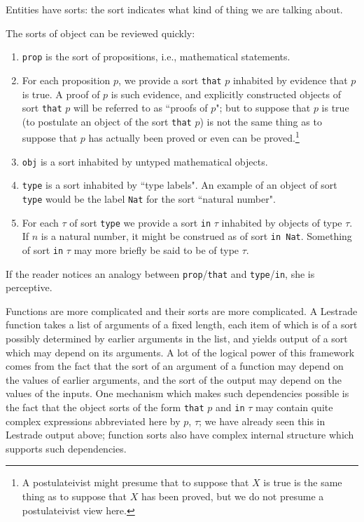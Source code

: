 \documentclass[12pt]{article}
\begin{document}
Entities have sorts:  the sort indicates what kind of thing we are talking about.  

The sorts of object can be reviewed quickly:

\begin{enumerate}

\item {\tt prop} is the sort of propositions, i.e., mathematical statements.

\item For each proposition $p$, we provide a sort {\tt that} $p$ inhabited by evidence that $p$ is true.  A proof of $p$ is such evidence, and explicitly constructed objects of sort {\tt that} $p$ will be referred to as ``proofs of $p$";  but to suppose that $p$ is true (to postulate an object of the sort {\tt that} $p$) is not the same thing as to suppose that $p$ has actually been proved or even can be proved.\footnote{A postulateivist might presume that to suppose that $X$ is true is the same thing as to suppose that $X$ has been proved, but we do not presume a postulateivist view here.}

\item {\tt obj} is a sort inhabited by untyped mathematical objects.

\item {\tt type} is a sort inhabited by ``type labels".  An example of an object of sort {\tt type} would be the label {\tt Nat} for the sort ``natural number".

\item For each $\tau$ of sort {\tt type} we provide a sort {\tt in} $\tau$ inhabited by objects of type $\tau$.  If $n$ is a natural number, it might be construed as of sort {\tt in Nat}.  Something of sort {\tt in} $\tau$ may more briefly be said to be of type $\tau$.

\end{enumerate}

If the reader notices an analogy between {\tt prop}/{\tt that} and {\tt type}/{\tt in}, she is perceptive.

Functions are more complicated and their sorts are more complicated.  A Lestrade function takes a list of arguments of a fixed length, each item of which is of a sort possibly determined by earlier arguments in the list, and yields output of a sort which may depend on its arguments.  A lot of the logical power of this framework comes from the fact that the sort of an argument of a function may depend on the values of earlier arguments, and the sort of the output may depend on the values of the inputs.  One mechanism which makes such dependencies possible is the fact that the object sorts of the form {\tt that} $p$ and {\tt in} $\tau$ may contain quite complex expressions abbreviated here by $p$, $\tau$;  we have already seen this in Lestrade output above;  function sorts also have complex internal structure which supports such dependencies.
\end{document}
